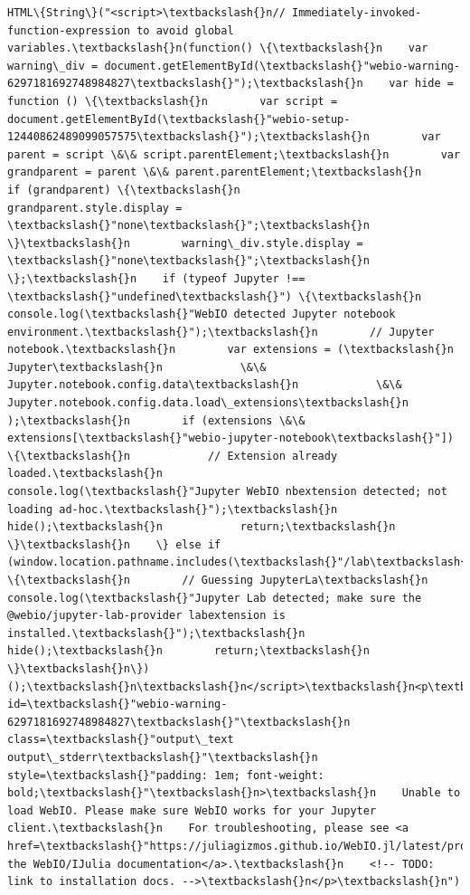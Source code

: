 \documentclass[11pt]{article}
\begin{document}
    \begin{Verbatim}[commandchars=\\\{\}]
HTML\{String\}("<script>\textbackslash{}n// Immediately-invoked-function-expression to avoid global variables.\textbackslash{}n(function() \{\textbackslash{}n    var warning\_div = document.getElementById(\textbackslash{}"webio-warning-6297181692748984827\textbackslash{}");\textbackslash{}n    var hide = function () \{\textbackslash{}n        var script = document.getElementById(\textbackslash{}"webio-setup-12440862489099057575\textbackslash{}");\textbackslash{}n        var parent = script \&\& script.parentElement;\textbackslash{}n        var grandparent = parent \&\& parent.parentElement;\textbackslash{}n        if (grandparent) \{\textbackslash{}n            grandparent.style.display = \textbackslash{}"none\textbackslash{}";\textbackslash{}n        \}\textbackslash{}n        warning\_div.style.display = \textbackslash{}"none\textbackslash{}";\textbackslash{}n    \};\textbackslash{}n    if (typeof Jupyter !== \textbackslash{}"undefined\textbackslash{}") \{\textbackslash{}n        console.log(\textbackslash{}"WebIO detected Jupyter notebook environment.\textbackslash{}");\textbackslash{}n        // Jupyter notebook.\textbackslash{}n        var extensions = (\textbackslash{}n            Jupyter\textbackslash{}n            \&\& Jupyter.notebook.config.data\textbackslash{}n            \&\& Jupyter.notebook.config.data.load\_extensions\textbackslash{}n        );\textbackslash{}n        if (extensions \&\& extensions[\textbackslash{}"webio-jupyter-notebook\textbackslash{}"]) \{\textbackslash{}n            // Extension already loaded.\textbackslash{}n            console.log(\textbackslash{}"Jupyter WebIO nbextension detected; not loading ad-hoc.\textbackslash{}");\textbackslash{}n            hide();\textbackslash{}n            return;\textbackslash{}n        \}\textbackslash{}n    \} else if (window.location.pathname.includes(\textbackslash{}"/lab\textbackslash{}")) \{\textbackslash{}n        // Guessing JupyterLa\textbackslash{}n        console.log(\textbackslash{}"Jupyter Lab detected; make sure the @webio/jupyter-lab-provider labextension is installed.\textbackslash{}");\textbackslash{}n        hide();\textbackslash{}n        return;\textbackslash{}n    \}\textbackslash{}n\})();\textbackslash{}n\textbackslash{}n</script>\textbackslash{}n<p\textbackslash{}n    id=\textbackslash{}"webio-warning-6297181692748984827\textbackslash{}"\textbackslash{}n    class=\textbackslash{}"output\_text output\_stderr\textbackslash{}"\textbackslash{}n    style=\textbackslash{}"padding: 1em; font-weight: bold;\textbackslash{}"\textbackslash{}n>\textbackslash{}n    Unable to load WebIO. Please make sure WebIO works for your Jupyter client.\textbackslash{}n    For troubleshooting, please see <a href=\textbackslash{}"https://juliagizmos.github.io/WebIO.jl/latest/providers/ijulia/\textbackslash{}">\textbackslash{}n    the WebIO/IJulia documentation</a>.\textbackslash{}n    <!-- TODO: link to installation docs. -->\textbackslash{}n</p>\textbackslash{}n")
    \end{Verbatim}
\end{document}
